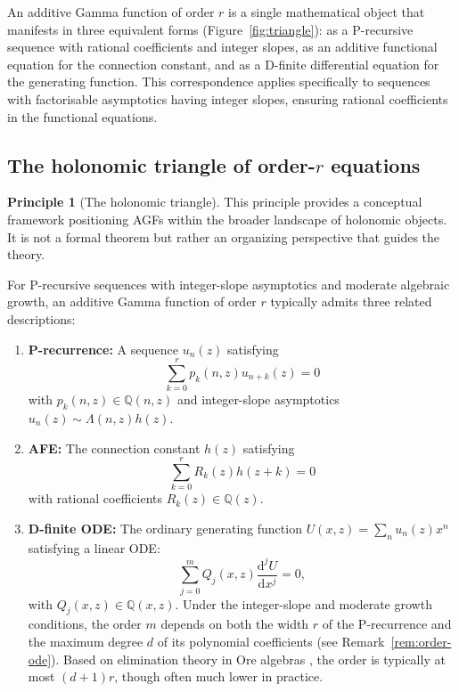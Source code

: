 \documentclass[11pt,reqno]{amsart}
\theoremstyle{definition}
\newtheorem{principle}{Principle}[section]
\newcommand{\Q}{\mathbb{Q}}
\newcommand{\dd}{\mathrm{d}}
\numberwithin{equation}{section}
\begin{document}
An additive Gamma function of order $r$ is a single mathematical object that manifests in three equivalent forms (Figure~\ref{fig:triangle}): as a P-recursive sequence with rational coefficients and integer slopes, as an additive functional equation for the connection constant, and as a D-finite differential equation for the generating function. This correspondence applies specifically to sequences with factorisable asymptotics having integer slopes, ensuring rational coefficients in the functional equations.

\subsection{The holonomic triangle of order-$r$ equations}

\begin{principle}[The holonomic triangle]\label{prin:holonomic}
This principle provides a conceptual framework positioning AGFs within the broader landscape of holonomic objects. It is not a formal theorem but rather an organizing perspective that guides the theory.

For P-recursive sequences with integer-slope asymptotics and moderate algebraic growth, an additive Gamma function of order $r$ typically admits three related descriptions:

\begin{enumerate}
\item \textbf{P-recurrence:} A sequence $u_n(z)$ satisfying
$$\sum_{k=0}^r p_k(n,z) u_{n+k}(z) = 0$$
with $p_k(n,z) \in \Q(n,z)$ and integer-slope asymptotics $u_n(z) \sim \Lambda(n,z)h(z)$.

\item \textbf{AFE:} The connection constant $h(z)$ satisfying
$$\sum_{k=0}^r R_k(z) h(z+k) = 0$$
with rational coefficients $R_k(z) \in \Q(z)$.

\item \textbf{D-finite ODE:} The ordinary generating function $U(x,z) = \sum_n u_n(z)x^n$ satisfying a linear ODE:
$$\sum_{j=0}^m Q_j(x,z) \frac{\dd^j U}{\dd x^j} = 0,$$
with $Q_j(x,z) \in \Q(x,z)$. Under the integer-slope and moderate growth conditions, the order $m$ depends on both the width $r$ of the P-recurrence and the maximum degree $d$ of its polynomial coefficients (see Remark~\ref{rem:order-ode}). Based on elimination theory in Ore algebras \cite{ChyzakSalvy1998,Koutschan2010}, the order is typically at most $(d+1)r$, though often much lower in practice.
\end{enumerate}


\end{principle}
\end{document}

